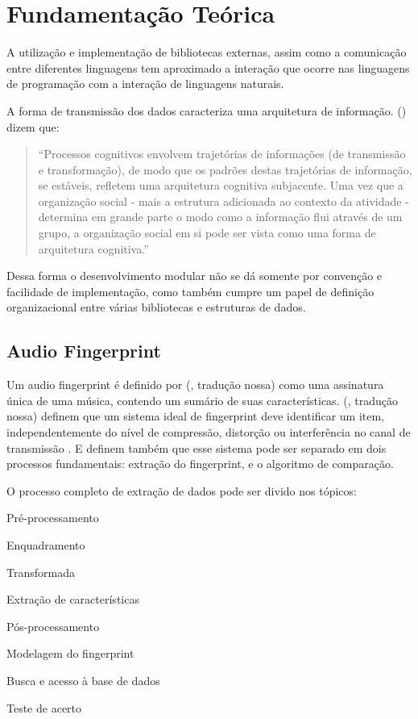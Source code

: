 \chapter{Fundamentação Teórica}
\label{c.fundamentacaoteorica}

A utilização e implementação de bibliotecas externas, assim como a comunicação entre diferentes linguagens tem aproximado a interação que ocorre nas linguagens de programação com a interação de linguagens naturais.

A forma de transmissão dos dados caracteriza uma arquitetura de informação.   (\citeyear{hollan}) dizem que:

\begin{quotation}
``Processos cognitivos envolvem trajetórias de informações (de transmissão e transformação), de modo que os padrões destas trajetórias de informação, se estáveis, refletem uma arquitetura cognitiva subjacente. Uma vez que a organização social - mais a estrutura adicionada ao contexto da atividade - determina em grande parte o modo como a informação flui através de um grupo, a organização social em si pode ser vista como uma forma de arquitetura cognitiva.''
\end{quotation}

Dessa forma o desenvolvimento modular não se dá somente por convenção e facilidade de implementação, como também cumpre um papel de definição organizacional entre várias bibliotecas e estruturas de dados.

\section{Audio Fingerprint}
\label{s.audiofingerprint}

Um audio fingerprint é definido por   (\citeyear{canoetal05}, tradução nossa) como uma assinatura única de uma música, contendo um sumário de suas características.  (\citeyear{canoetal05}, tradução nossa) definem que um sistema ideal de fingerprint deve identificar um item, independentemente do nível de compressão, distorção ou interferência no canal de transmissão . E definem também que esse sistema pode ser separado em dois processos fundamentais: extração do fingerprint, e o algoritmo de comparação.

O processo completo de extração de dados pode ser divido nos tópicos:

\begin{alineas}

\item Pré-processamento
\item Enquadramento
\item Transformada
\item Extração de características
\item Pós-processamento
\item Modelagem do fingerprint
\item Busca e acesso à base de dados
\item Teste de acerto

\end{alineas}

